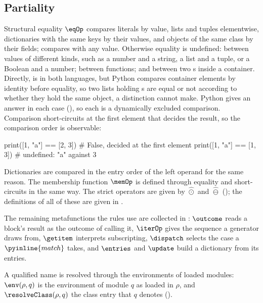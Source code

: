 \subsection{Partiality}
\label{sec:partiality}



Structural equality $\eqOp$ compares literals by value, lists and tuples elementwise, dictionaries with
the same keys by their values, and objects of the same class by their fields;  compares
with any value. Otherwise equality is undefined: between values of different kinds, such as a number and a
string, a list and a tuple, or a Boolean and a number; between functions; and between two
s inside a container. Directly,  is  in both languages,
but Python compares container elements by identity before equality, so two lists holding s
are equal or not according to whether they hold the same object, a distinction \PurePy cannot make.
Python gives an answer in each case (), so each is a dynamically excluded comparison. Comparison short-circuits at the first element that
decides the result, so the comparison order is observable:

\begin{python}
print([1, "a"] == [2, 3])  # False, decided at the first element
print([1, "a"] == [1, 3])  # undefined: "a" against 3
\end{python}

\noindent Dictionaries are compared in the entry order of the left operand for the same reason. The membership
function $\memOp$ is defined through equality and short-circuits in the same way. The strict operators are given by
$\hat{\odot}$ and $\hat{\ominus}$ (); the definitions of all of these are given in
\specification.




The remaining metafunctions the rules use are collected in : $\outcome$ reads a
block's result as the outcome of calling it, $\iterOp$ gives the sequence a generator draws from, $\getitem$
interprets subscripting, $\dispatch$ selects the case a $\pyinline{match}$ takes, and $\entries$ and
$\update$ build a dictionary from its entries.



A qualified name is resolved through the environments of loaded modules: $\env(\rho, q)$ is the
environment of module $q$ as loaded in $\rho$, and $\resolveClass(\rho, q)$ the class entry that $q$
denotes ().



